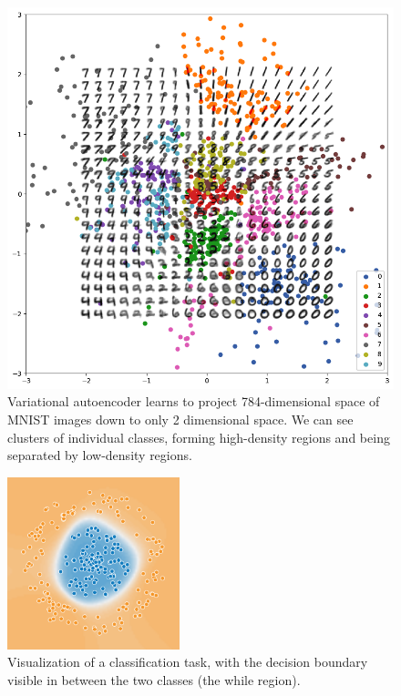 \begin{figure}[p]
    \centering
    \includegraphics[width=140mm]{../img/mnist-manifold.png}
    \caption{Variational autoencoder learns to project 784-dimensional space of MNIST images down to only 2 dimensional space. We can see clusters of individual classes, forming high-density regions and being separated by low-density regions.}
    \label{fig:MnistManifold}
\end{figure}

\begin{figure}[p]
    \centering
    \includegraphics[width=50mm]{../img/decision-boundary.png}
    \caption{Visualization of a classification task, with the decision boundary visible in between the two classes (the while region).}
    \label{fig:DecisionBoundary}
\end{figure}

